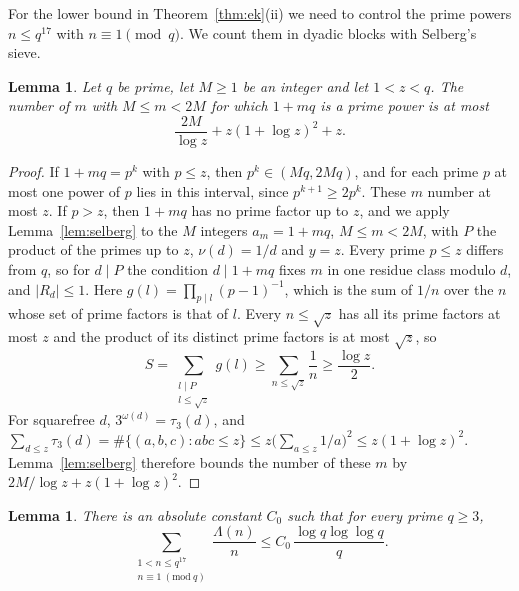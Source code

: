 \documentclass{aomart}
\numberwithin{equation}{section}
\newtheorem{lemma}[theorem]{Lemma}
\theoremstyle{definition}
\begin{document}
For the lower bound in Theorem~\ref{thm:ek}(ii) we need to control the prime powers $n\le q^{17}$
with $n\equiv1\pmod q$. We count them in dyadic blocks with Selberg's sieve.

\begin{lemma}\label{lem:block}
Let $q$ be prime, let $M\ge1$ be an integer and let $1<z<q$. The number of $m$ with
$M\le m<2M$ for which $1+mq$ is a prime power is at most
\[
  \frac{2M}{\log z}+z(1+\log z)^2+z.
\]
\end{lemma}

\begin{proof}
If $1+mq=p^k$ with $p\le z$, then $p^k\in(Mq,2Mq)$, and for each prime $p$ at most one power of
$p$ lies in this interval, since $p^{k+1}\ge2p^k$. These $m$ number at most $z$. If $p>z$, then
$1+mq$ has no prime factor up to $z$, and we apply Lemma~\ref{lem:selberg} to the $M$ integers
$a_m=1+mq$, $M\le m<2M$, with $P$ the product of the primes up to $z$, $\nu(d)=1/d$ and $y=z$.
Every prime $p\le z$ differs from $q$, so for $d\mid P$ the condition $d\mid1+mq$ fixes $m$ in one
residue class modulo $d$, and $|R_d|\le1$. Here $g(l)=\prod_{p\mid l}(p-1)^{-1}$, which is the sum
of $1/n$ over the $n$ whose set of prime factors is that of $l$. Every $n\le\sqrt z$ has all its
prime factors at most $z$ and the product of its distinct prime factors is at most $\sqrt z$, so
\[
  S=\sum_{\substack{l\mid P\\l\le\sqrt z}}g(l)\ge\sum_{n\le\sqrt z}\frac1n\ge\frac{\log z}2.
\]
For squarefree $d$, $3^{\omega(d)}=\tau_3(d)$, and
$\sum_{d\le z}\tau_3(d)=\#\{(a,b,c):abc\le z\}\le z\bigl(\sum_{a\le z}1/a\bigr)^2\le z(1+\log z)^2$.
Lemma~\ref{lem:selberg} therefore bounds the number of these $m$ by $2M/\log z+z(1+\log z)^2$.
\end{proof}

\begin{lemma}\label{lem:progression}
There is an absolute constant $C_0$ such that for every prime $q\ge3$,
\[
  \sum_{\substack{1<n\le q^{17}\\n\equiv1\ (\mathrm{mod}\ q)}}\frac{\Lambda(n)}n
  \le C_0\,\frac{\log q\log\log q}q.
\]
\end{lemma}
\end{document}
